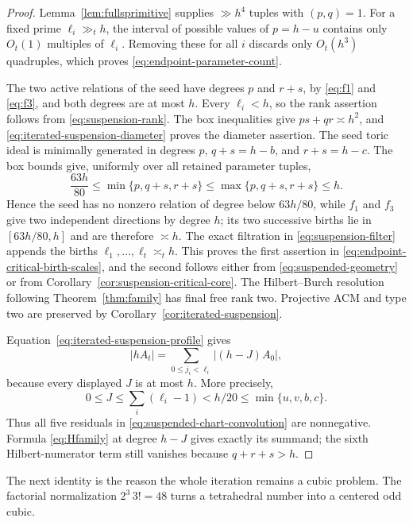 \documentclass[11pt,reqno]{amsart}
\theoremstyle{definition}
\theoremstyle{remark}
\begin{document}
\begin{proof}
Lemma~\ref{lem:fullsprimitive} supplies $\gg h^4$ tuples with $(p,q)=1$.
For a fixed prime $\ell_i\gg_t h$, the interval of possible values of
$p=h-u$ contains only $O_t(1)$ multiples of $\ell_i$.  Removing these for
all $i$ discards only $O_t(h^3)$ quadruples, which proves
\eqref{eq:endpoint-parameter-count}.

The two active relations of the seed have degrees $p$ and $r+s$, by
\eqref{eq:f1} and \eqref{eq:f3}, and both degrees are at most $h$.
Every $\ell_i<h$, so the rank assertion follows from
\eqref{eq:suspension-rank}.  The box inequalities give
$ps+qr\asymp h^2$, and
\eqref{eq:iterated-suspension-diameter} proves the diameter assertion.
The seed toric ideal is minimally generated in degrees
$p$, $q+s=h-b$, and $r+s=h-c$.  The box bounds give, uniformly over all
retained parameter tuples,
\[
 \frac{63h}{80}\leq\min\{p,q+s,r+s\}
 \leq\max\{p,q+s,r+s\}\leq h.
\]
Hence the seed has no nonzero relation of degree below $63h/80$, while
$f_1$ and $f_3$ give two independent directions by degree $h$; its two
successive births lie in $[63h/80,h]$ and are therefore $\asymp h$.
The exact filtration in
\eqref{eq:suspension-filter} appends the births
$\ell_1,\ldots,\ell_t\asymp_t h$.  This proves the first assertion in
\eqref{eq:endpoint-critical-birth-scales}, and the second follows either
from \eqref{eq:suspended-geometry} or from
Corollary~\ref{cor:suspension-critical-core}.
The Hilbert--Burch resolution following Theorem~\ref{thm:family} has final
free rank two.  Projective ACM and type two are preserved by
Corollary~\ref{cor:iterated-suspension}.

Equation~\eqref{eq:iterated-suspension-profile} gives
\[
 |hA_t|=\sum_{0\leq j_i<\ell_i}|(h-J)A_0|,
\]
because every displayed $J$ is at most $h$.  More precisely,
\[
 0\leq J\leq\sum_i(\ell_i-1)<h/20\leq\min\{u,v,b,c\}.
\]
Thus all five residuals in
\eqref{eq:suspended-chart-convolution} are nonnegative.  Formula
\eqref{eq:Hfamily} at degree $h-J$ gives exactly its summand; the sixth
Hilbert-numerator term still vanishes because $q+r+s>h$.
\end{proof}

The next identity is the reason the whole iteration remains a cubic
problem.  The factorial normalization $2^3\,3!=48$ turns a tetrahedral
number into a centered odd cubic.
\end{document}
